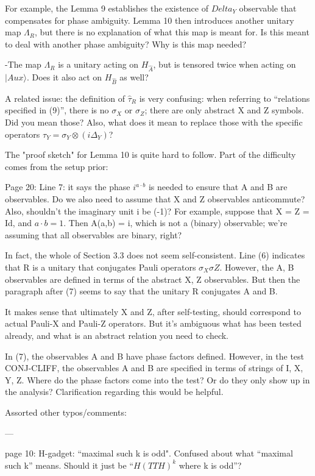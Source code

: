 \documentclass[12pt]{article}
\newcommand{\ket}[1]{|#1\rangle}
\begin{document}
For example, the Lemma 9 establishes the existence of $Delta_Y$ observable that compensates for phase ambiguity. Lemma 10 then introduces another unitary map $\Lambda_R$, but there is no explanation of what this map is meant for. Is this meant to deal with another phase ambiguity? Why is this map needed?

-The map $\Lambda_R$ is a unitary acting on $H_{\hat{A}}$, but is tensored twice when acting on $\ket{Aux}$. Does it also act on $H_{\hat{B}}$ as well? 

A related issue: the definition of $\hat{\tau}_R$ is very confusing: when referring to “relations specified in (9)”, there is no $\sigma_X$ or $\sigma_Z$; there are only abstract X and Z symbols. Did you mean those? Also, what does it mean to replace those with the specific operators $\tau_Y = \sigma_Y \otimes (i \Delta_Y)$? 


The "proof sketch" for Lemma 10 is quite hard to follow. Part of the difficulty comes from the setup prior:

Page 20: Line 7: it says the phase $i^{a \cdot b}$ is needed to ensure that A and B are observables. Do we also need to assume that X and Z observables anticommute? Also, shouldn’t the imaginary unit i be (-1)? For example, suppose that X = Z = Id, and $a \cdot b = 1$. Then A(a,b) = i, which is not a (binary) observable; we’re assuming that all observables are binary, right?

In fact, the whole of Section 3.3 does not seem self-consistent. Line (6) indicates that R is a unitary that conjugates Pauli operators $\sigma_X \sigma Z$. However, the A, B observables are defined in terms of the abstract X, Z observables. But then the paragraph after (7) seems to say that the unitary R conjugates A and B. 

It makes sense that ultimately X and Z, after self-testing, should correspond to actual Pauli-X and Pauli-Z operators. But it’s ambiguous what has been tested already, and what is an abstract relation you need to check. 

In (7), the observables A and B have phase factors defined. However, in the test CONJ-CLIFF, the observables A and B are specified in terms of strings of I, X, Y, Z. Where do the phase factors come into the test? Or do they only show up in the analysis? Clarification regarding this would be helpful.


Assorted other typos/comments:

---


page 10: H-gadget: “maximal such k is odd". Confused about what “maximal such k” means. Should it just be “$H(TTH)^k$ where k is odd”?
\end{document}
